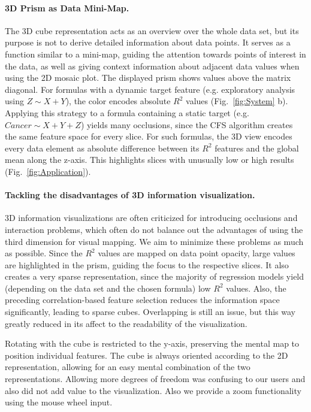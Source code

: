 \documentclass[journal]{style/vgtc} 			          %
\begin{document}
\paragraph{3D Prism as Data Mini-Map.}
The 3D cube representation acts as an overview over the whole data set, but its purpose is not to derive detailed information about data points.
It serves as a function similar to a mini-map, guiding the attention towards points of interest in the data, as well as giving context information about adjacent data values when using the 2D mosaic plot.
The displayed prism shows values above the matrix diagonal.
For formulas with a dynamic target feature (e.g. exploratory analysis using $Z \sim X + Y$), the color encodes absolute $R^2$ values (Fig.~\ref{fig:System} b).
Applying this strategy to a formula containing a static target (e.g. $Cancer \sim X + Y + Z$) yields many occlusions, since the CFS algorithm creates the same feature space for every slice.
For such formulas, the 3D view encodes every data element as absolute difference between its $R^2$ features and the global mean along the z-axis.
This highlights slices with unusually low or high results (Fig.~\ref{fig:Application}).
\paragraph{Tackling the disadvantages of 3D information visualization.}
3D information visualizations are often criticized for introducing occlusions and interaction problems, which often do not balance out the advantages of using the third dimension for visual mapping.
We aim to minimize these problems as much as possible.
Since the $R^2$ values are mapped on data point opacity, large values are highlighted in the prism, guiding the focus to the respective slices.
It also creates a very sparse representation, since the majority of regression models yield (depending on the data set and the chosen formula) low $R^2$ values.
Also, the preceding correlation-based feature selection reduces the information space significantly, leading to sparse cubes.
Overlapping is still an issue, but this way greatly reduced in its affect to the readability of the visualization.

Rotating with the cube is restricted to the y-axis, preserving the mental map to position individual features.
The cube is always oriented according to the 2D representation, allowing for an easy mental combination of the two representations.
Allowing more degrees of freedom was confusing to our users and also did not add value to the visualization.
Also we provide a zoom functionality using the mouse wheel input.
\end{document}
